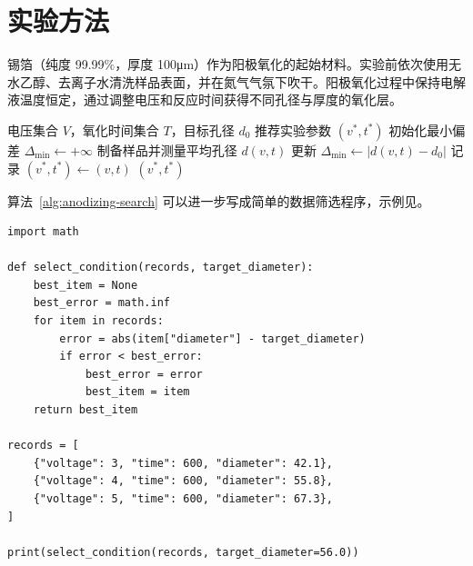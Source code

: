 \section{实验方法}

锡箔（纯度 99.99\%，厚度 100μm）作为阳极氧化的起始材料。实验前依次使用无水乙醇、去离子水清洗样品表面，并在氮气气氛下吹干。阳极氧化过程中保持电解液温度恒定，通过调整电压和反应时间获得不同孔径与厚度的氧化层。

\begin{algorithm}[htbp]
  \caption{阳极氧化参数筛选流程}
  \label{alg:anodizing-search}
  \begin{algorithmic}[1]
    \Require 电压集合 $V$，氧化时间集合 $T$，目标孔径 $d_0$
    \Ensure 推荐实验参数 $(v^*, t^*)$
    \State 初始化最小偏差 $\Delta_{\min} \leftarrow +\infty$
        \State 制备样品并测量平均孔径 $d(v,t)$
          \State 更新 $\Delta_{\min} \leftarrow |d(v,t)-d_0|$
          \State 记录 $(v^*, t^*) \leftarrow (v,t)$
        \EndIf
      \EndFor
    \EndFor
    \State \Return $(v^*, t^*)$
  \end{algorithmic}
\end{algorithm}
\FloatBarrier

算法~\ref{alg:anodizing-search} 可以进一步写成简单的数据筛选程序，示例见。

\begin{lstlisting}[style=mypython,caption=阳极氧化参数筛选示例,label=code:parameter-search]
import math

def select_condition(records, target_diameter):
    best_item = None
    best_error = math.inf
    for item in records:
        error = abs(item["diameter"] - target_diameter)
        if error < best_error:
            best_error = error
            best_item = item
    return best_item

records = [
    {"voltage": 3, "time": 600, "diameter": 42.1},
    {"voltage": 4, "time": 600, "diameter": 55.8},
    {"voltage": 5, "time": 600, "diameter": 67.3},
]

print(select_condition(records, target_diameter=56.0))
\end{lstlisting}


